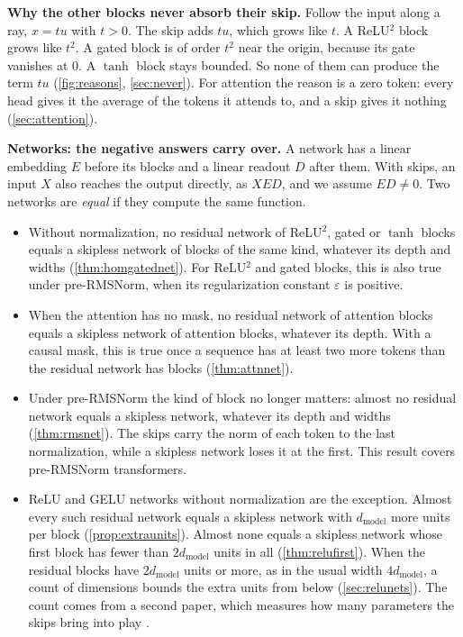 \documentclass[10pt]{article}
\theoremstyle{definition}
\theoremstyle{remark}
\newcommand{\dm}{d_{\mathrm{model}}}
\newcommand{\para}[1]{\smallskip\noindent\textbf{#1}\hspace{0.5em}}
\begin{document}
\para{Why the other blocks never absorb their skip.} Follow the input along a ray, $x = tu$ with $t > 0$. The skip adds $tu$, which grows like $t$. A ReLU$^2$ block grows like $t^2$. A gated block is of order $t^2$ near the origin, because its gate vanishes at $0$. A $\tanh$ block stays bounded. So none of them can produce the term $tu$ (\cref{fig:reasons}, \cref{sec:never}). For attention the reason is a zero token: every head gives it the average of the tokens it attends to, and a skip gives it nothing (\cref{sec:attention}).

\para{Networks: the negative answers carry over.} A network has a linear embedding $E$ before its blocks and a linear readout $D$ after them. With skips, an input $X$ also reaches the output directly, as $XED$, and we assume $ED \neq 0$. Two networks are \emph{equal} if they compute the same function.
\begin{itemize}
\item Without normalization, no residual network of ReLU$^2$, gated or $\tanh$ blocks equals a skipless network of blocks of the same kind, whatever its depth and widths (\cref{thm:homgatednet}). For ReLU$^2$ and gated blocks, this is also true under pre-RMSNorm, when its regularization constant $\varepsilon$ is positive.
\item When the attention has no mask, no residual network of attention blocks equals a skipless network of attention blocks, whatever its depth. With a causal mask, this is true once a sequence has at least two more tokens than the residual network has blocks (\cref{thm:attnnet}).
\item Under pre-RMSNorm the kind of block no longer matters: almost no residual network equals a skipless network, whatever its depth and widths (\cref{thm:rmsnet}). The skips carry the norm of each token to the last normalization, while a skipless network loses it at the first. This result covers pre-RMSNorm transformers.
\item ReLU and GELU networks without normalization are the exception. Almost every such residual network equals a skipless network with $\dm$ more units per block (\cref{prop:extraunits}). Almost none equals a skipless network whose first block has fewer than $2\dm$ units in all (\cref{thm:relufirst}). When the residual blocks have $2\dm$ units or more, as in the usual width $4\dm$, a count of dimensions bounds the extra units from below (\cref{sec:relunets}). The count comes from a second paper, which measures how many parameters the skips bring into play \citep{karbevski2026unlock}.
\end{itemize}
\end{document}
